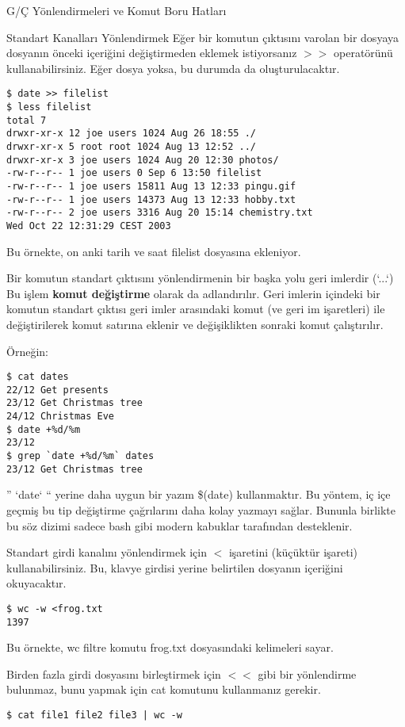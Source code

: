 \begin{section}{G/Ç Yönlendirmeleri ve Komut Boru Hatları}
\begin{subsection}{Standart Kanalları Yönlendirmek}
Eğer bir komutun çıktısını varolan bir dosyaya dosyanın önceki içeriğini değiştirmeden eklemek istiyorsanız $>>$ operatörünü kullanabilirsiniz. Eğer dosya yoksa, bu durumda da oluşturulacaktır.
\begin{verbatim}
$ date >> filelist
$ less filelist
total 7
drwxr-xr-x 12 joe users 1024 Aug 26 18:55 ./
drwxr-xr-x 5 root root 1024 Aug 13 12:52 ../
drwxr-xr-x 3 joe users 1024 Aug 20 12:30 photos/
-rw-r--r-- 1 joe users 0 Sep 6 13:50 filelist
-rw-r--r-- 1 joe users 15811 Aug 13 12:33 pingu.gif
-rw-r--r-- 1 joe users 14373 Aug 13 12:33 hobby.txt
-rw-r--r-- 2 joe users 3316 Aug 20 15:14 chemistry.txt
Wed Oct 22 12:31:29 CEST 2003
\end{verbatim}

Bu örnekte, on anki tarih ve saat filelist dosyasına ekleniyor.

Bir komutun standart çıktısını yönlendirmenin bir başka yolu geri imlerdir (`...`) Bu işlem \textbf{komut değiştirme} olarak da adlandırılır. Geri imlerin içindeki bir komutun standart çıktısı geri imler arasındaki komut (ve geri im işaretleri) ile değiştirilerek komut satırına eklenir ve değişiklikten sonraki komut çalıştırılır.

Örneğin:
\begin{verbatim}
$ cat dates
22/12 Get presents
23/12 Get Christmas tree
24/12 Christmas Eve
$ date +%d/%m
23/12
$ grep `date +%d/%m` dates
23/12 Get Christmas tree
\end{verbatim}

” `date` “ yerine daha uygun bir yazım \$(date) kullanmaktır. Bu yöntem, iç içe geçmiş bu tip değiştirme çağrılarını daha kolay yazmayı sağlar. Bununla birlikte bu söz dizimi sadece bash gibi modern kabuklar tarafından desteklenir.

Standart girdi kanalını yönlendirmek için $<$ işaretini (küçüktür işareti) kullanabilirsiniz. Bu, klavye girdisi yerine belirtilen dosyanın içeriğini okuyacaktır.
\begin{verbatim}
$ wc -w <frog.txt
1397
\end{verbatim}

Bu örnekte, wc filtre komutu frog.txt dosyasındaki kelimeleri sayar.

Birden fazla girdi dosyasını birleştirmek için $<<$ gibi bir yönlendirme bulunmaz, bunu yapmak için cat komutunu kullanmanız gerekir.

\begin{verbatim}
$ cat file1 file2 file3 | wc -w
\end{verbatim}


\end{subsection}
\end{section}

